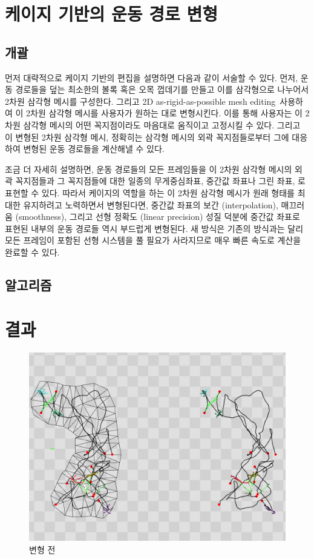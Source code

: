 \documentclass[12pt,a4paper,oneside,final]{report}
\newcommand{\Igarashi}{\cite{Igarashi:2005:ASM:1073204.1073323}}
\begin{document}
\chapter{케이지 기반의 운동 경로 변형}
\section{개괄}
먼저 대략적으로 케이지 기반의 편집을 설명하면 다음과 같이 서술할 수 있다.
먼저, 운동 경로들을 덮는 최소한의 볼록 혹은 오목 껍데기를 만들고 이를
삼각형으로 나누어서 2차원 삼각형 메시를 구성한다. 그리고 2D as-rigid-as-possible mesh
editing~ 사용하여 이 2차원 삼각형 메시를 사용자가 원하는 대로 변형시킨다.
이를 통해 사용자는 이 2차원 삼각형 메시의 어떤 꼭지점이라도 마음대로 움직이고 고정시킬
수 있다. 그리고 이 변형된 2차원 삼각형 메시, 정확히는 삼각형 메시의 외곽 꼭지점들로부터 그에
대응하여 변형된 운동 경로들을 계산해낼 수 있다.

조금 더 자세히 설명하면, 운동 경로들의 모든 프레임들을 이 2차원 삼각형 메시의 외곽
꼭지점들과 그 꼭지점들에 대한 일종의 무게중심좌표, 중간값 좌표나 그린 좌표, 로
표현할 수 있다. 따라서 케이지의 역할을 하는 이 2차원 삼각형 메시가 원래 형태를 최대한
유지하려고 노력하면서 변형된다면, 중간값 좌표의 보간 (interpolation), 매끄러움
(smoothness), 그리고 선형 정확도 (linear precision) 성질 덕분에 중간값 좌표로
표현된 내부의 운동 경로들 역시 부드럽게 변형된다. 새 방식은 기존의 방식과는
달리 모든 프레임이 포함된 선형 시스템을 풀 필요가 사라지므로 매우 빠른 속도로
계산을 완료할 수 있다.

\section{알고리즘}

\chapter{결과}

\begin{figure}[p]
\centering
\includegraphics[width=0.9\linewidth]{before_deform_c.png}
\caption{변형 전}
\label{fig:before_deform}
\end{figure}
\end{document}
